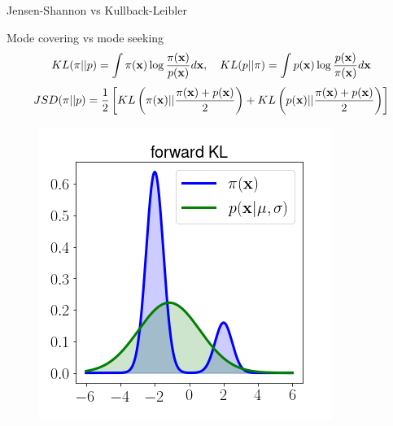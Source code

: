\begin{frame}{Jensen-Shannon vs Kullback-Leibler }
	\begin{block}{Mode covering vs mode seeking}
		\vspace{-0.2cm}
		\[
			KL(\pi || p) = \int \pi(\mathbf{x}) \log \frac{\pi(\mathbf{x})}{p(\mathbf{x})}d\mathbf{x}, \quad KL(p || \pi) = \int p(\mathbf{x}) \log \frac{p(\mathbf{x})}{\pi(\mathbf{x})}d\mathbf{x}
		\]
		\[
		JSD(\pi || p) = \frac{1}{2} \left[KL \left(\pi(\mathbf{x}) || \frac{\pi(\mathbf{x}) + p(\mathbf{x})}{2}\right) + KL \left(p(\mathbf{x}) || \frac{\pi(\mathbf{x}) + p(\mathbf{x})}{2}\right) \right]
		\]
		\vspace{-0.4cm}
		
	\begin{minipage}[t]{0.33\columnwidth}
		\begin{figure}
			\includegraphics[width=\linewidth]{figs/forward_KL}
		\end{figure}
	\end{minipage}%
	\begin{minipage}[t]{0.33\columnwidth}
			\begin{figure}

\end{figure}
\end{minipage}
\end{block}
\end{frame}
